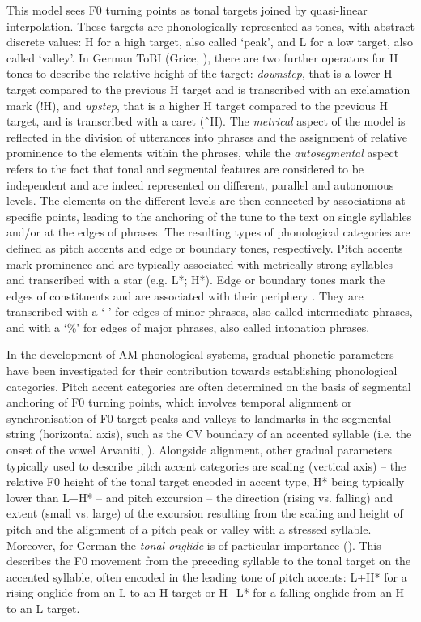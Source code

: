 This model sees F0 turning points as tonal targets joined by quasi-linear interpolation. These targets are phonologically represented as tones, with abstract discrete values: H for a high target, also called ‘peak’, and L for a low target, also called ‘valley’. In German ToBI (Grice, \citealt{BaumannBenzmüller2005}), there are two further operators for H tones to describe the relative height of the target: \textit{downstep}, that is a lower H target compared to the previous H target and is transcribed with an exclamation mark (!H), and \textit{upstep}, that is a higher H target compared to the previous H target, and is transcribed with a caret (ˆH). The \textit{metrical} aspect of the model is reflected in the division of utterances into phrases and the assignment of relative prominence to the elements within the phrases, while the \textit{autosegmental} aspect refers to the fact that tonal and segmental features are considered to be independent and are indeed represented on different, parallel and autonomous levels. The elements on the different levels are then connected by associations at specific points, leading to the anchoring of the tune to the text on single syllables and/or at the edges of phrases. The resulting types of phonological categories are defined as pitch accents and edge or boundary tones, respectively. Pitch accents mark prominence and are typically associated with metrically strong syllables and transcribed with a star (e.g. L*; H*). Edge or boundary tones mark the edges of constituents and are associated with their periphery \citep{GriceEtAl2005}. They are transcribed with a ‘-’ for edges of minor phrases, also called intermediate phrases, and with a ‘\%’ for edges of major phrases, also called intonation phrases.

In the development of AM phonological systems, gradual phonetic parameters have been investigated for their contribution towards establishing phonological categories. Pitch accent categories are often determined on the basis of segmental anchoring of F0 turning points, which involves temporal alignment or synchronisation of F0 target peaks and valleys to landmarks in the segmental string (horizontal axis), such as the \textsc{CV} boundary of an accented syllable (i.e. the onset of the vowel Arvaniti, \citealt{LaddMennen1998}). Alongside alignment, other gradual parameters typically used to describe pitch accent categories are scaling (vertical axis) – the relative F0 height of the tonal target encoded in accent type, H* being typically lower than L+H* – and pitch excursion – the direction (rising vs. falling) and extent (small vs. large) of the excursion resulting from the scaling and height of pitch and the alignment of a pitch peak or valley with a stressed syllable. Moreover, for German the \textit{tonal onglide} is of particular importance (\citealt{RitterGrice2015}). This describes the F0 movement from the preceding syllable to the tonal target on the accented syllable, often encoded in the leading tone of pitch accents: L+H* for a rising onglide from an L to an H target or H+L* for a falling onglide from an H to an L target.

